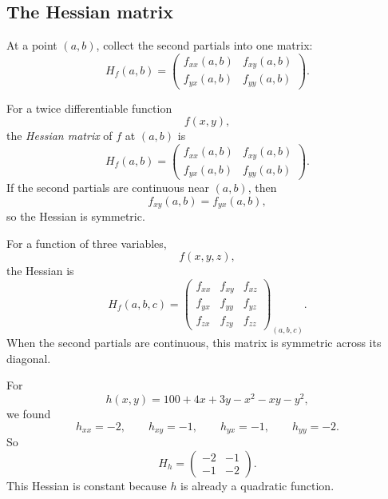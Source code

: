 \subsection{The Hessian matrix}

At a point \((a,b)\), collect the second partials into one matrix:
\[
    H_f(a,b)
    =
    \begin{pmatrix}
        f_{xx}(a,b) & f_{xy}(a,b)\\
        f_{yx}(a,b) & f_{yy}(a,b)
    \end{pmatrix}.
\]

\begin{definition}
For a twice differentiable function
\[
    f(x,y),
\]
the \emph{Hessian matrix} of \(f\) at \((a,b)\) is
\[
\boxed{
    H_f(a,b)
    =
    \begin{pmatrix}
        f_{xx}(a,b) & f_{xy}(a,b)\\
        f_{yx}(a,b) & f_{yy}(a,b)
    \end{pmatrix}.
}
\]
If the second partials are continuous near \((a,b)\), then
\[
    f_{xy}(a,b)=f_{yx}(a,b),
\]
so the Hessian is symmetric.
\end{definition}

For a function of three variables,
\[
    f(x,y,z),
\]
the Hessian is
\[
\boxed{
H_f(a,b,c)
=
\begin{pmatrix}
f_{xx} & f_{xy} & f_{xz}\\
f_{yx} & f_{yy} & f_{yz}\\
f_{zx} & f_{zy} & f_{zz}
\end{pmatrix}_{(a,b,c)}.
}
\]
When the second partials are continuous, this matrix is symmetric across its diagonal.

\begin{example}
For
\[
    h(x,y)=100+4x+3y-x^2-xy-y^2,
\]
we found
\[
    h_{xx}=-2,
    \qquad
    h_{xy}=-1,
    \qquad
    h_{yx}=-1,
    \qquad
    h_{yy}=-2.
\]
So
\[
    H_h=
    \begin{pmatrix}
        -2 & -1\\
        -1 & -2
    \end{pmatrix}.
\]
This Hessian is constant because \(h\) is already a quadratic function.
\end{example}

